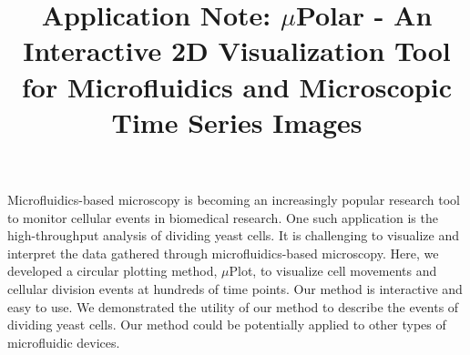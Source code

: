 \documentclass[conference]{IEEEtran}
\begin{document}
\title{ Application Note: $\mu$Polar \-- An Interactive 2D Visualization Tool for  Microfluidics and  Microscopic Time Series Images }


\maketitle

\begin{Summary}
Microfluidics-based microscopy is becoming an increasingly popular research tool to monitor cellular events in biomedical research. One such application is the high-throughput analysis of dividing yeast cells. It is challenging to visualize and interpret the data gathered through microfluidics-based microscopy. Here, we developed a circular plotting method, $\mu$Plot, to visualize cell movements and cellular division events at hundreds of time points. Our method is interactive and easy to use. We demonstrated the utility of our method to describe the events of dividing yeast cells. Our method could be potentially applied to other types of microfluidic devices. 

\end{Summary}
\end{document}
